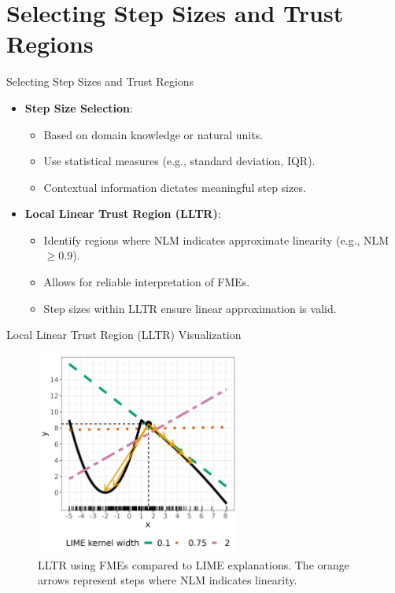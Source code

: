 \documentclass[11pt,compress,t,notes=noshow, aspectratio=169, xcolor=table]{beamer}
\begin{document}
\section{Selecting Step Sizes and Trust Regions}

\begin{frame}{Selecting Step Sizes and Trust Regions}
\begin{itemize}
\item \textbf{Step Size Selection}:
\begin{itemize}
  \item Based on domain knowledge or natural units.
  \item Use statistical measures (e.g., standard deviation, IQR).
  \item Contextual information dictates meaningful step sizes.
\end{itemize}
\item \textbf{Local Linear Trust Region (LLTR)}:
\begin{itemize}
  \item Identify regions where NLM indicates approximate linearity (e.g., NLM $\geq 0.9$).
  \item Allows for reliable interpretation of FMEs.
  \item Step sizes within LLTR ensure linear approximation is valid.
\end{itemize}
\end{itemize}
\end{frame}

\begin{frame}{Local Linear Trust Region (LLTR) Visualization}
\begin{figure}
  \centering
  \includegraphics[width=0.6\textwidth]{figure-man/fme_trust_region_lime.png}
  \caption{LLTR using FMEs compared to LIME explanations. The orange arrows represent steps where NLM indicates linearity.}
\end{figure}
\end{frame}
\end{document}
